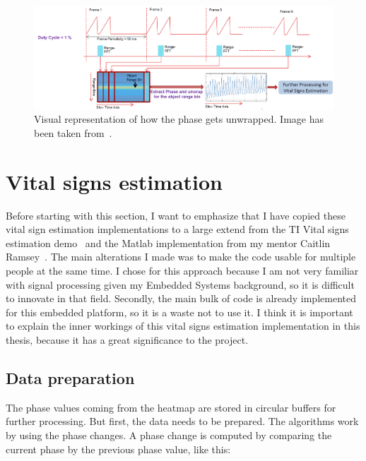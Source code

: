 \begin{figure}[t]
\centering
\includegraphics[width=.95\textwidth]{figures/measuring_vital_signs/phase_unwrapping.png}
\caption{Visual representation of how the phase gets unwrapped. Image has been taken from~\cite{vital_signs_lab_website}.}
\label{fig:phase_unwrapping}
\end{figure}

\section{Vital signs estimation}
\label{sec:vit_signs_est}
Before starting with this section, I want to emphasize that I have copied these vital sign estimation implementations to a large extend from the TI Vital signs estimation demo~\cite{vital_signs_lab_website} and the Matlab implementation from my mentor Caitlin Ramsey~\cite{caitlin_msc_thesis_2020}. The main alterations I made was to make the code usable for multiple people at the same time. I chose for this approach because I am not very familiar with signal processing given my Embedded Systems background, so it is difficult to innovate in that field. Secondly, the main bulk of code is already implemented for this embedded platform, so it is a waste not to use it. I think it is important to explain the inner workings of this vital signs estimation implementation in this thesis, because it has a great significance to the project.


\subsection{Data preparation}
The phase values coming from the heatmap are stored in circular buffers for further processing. But first, the data needs to be prepared. The algorithms work by using the phase changes. A phase change is computed by comparing the current phase by the previous phase value, like this:

